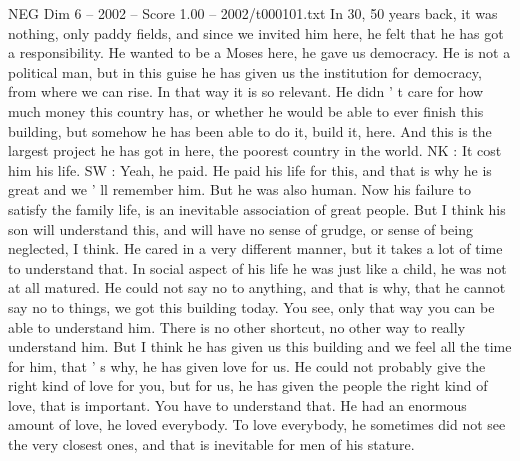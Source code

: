 \begin{textsample}{NEG Dim 6 – 2002 – Score 1.00 – 2002/t000101.txt}
In 30, 50 years back, it was nothing, only paddy fields, and since we invited him here, he felt that he has got a responsibility.
He wanted to be a Moses here, he gave us democracy.
He is not a political man, but in this guise he has given us the institution for democracy, from where we can rise.
In that way it is so relevant.
He didn ' t care for how much money this country has, or whether he would be able to ever finish this building, but somehow he has been able to do it, build it, here.
And this is the largest project he has got in here, the poorest country in the world.
NK : It cost him his life.
SW : Yeah, he paid.
He paid his life for this, and that is why he is great and we ' ll remember him.
But he was also human.
Now his failure to satisfy the family life, is an inevitable association of great people.
But I think his son will understand this, and will have no sense of grudge, or sense of being neglected, I think.
He cared in a very different manner, but it takes a lot of time to understand that.
In social aspect of his life he was just like a child, he was not at all matured.
He could not say no to anything, and that is why, that he cannot say no to things, we got this building today.
You see, only that way you can be able to understand him.
There is no other shortcut, no other way to really understand him.
But I think he has given us this building and we feel all the time for him, that ' s why, he has given love for us.
He could not probably give the right kind of love for you, but for us, he has given the people the right kind of love, that is important.
You have to understand that.
He had an enormous amount of love, he loved everybody.
To love everybody, he sometimes did not see the very closest ones, and that is inevitable for men of his stature.

\end{textsample}
